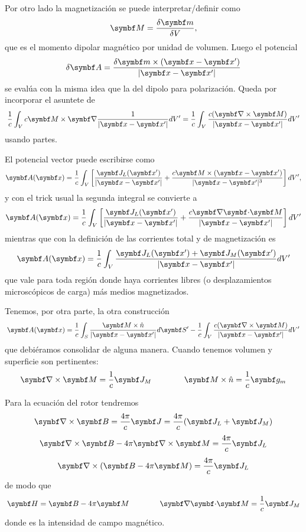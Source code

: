 \documentclass[10pt,oneside]{CBFT_book}
\begin{document}
Por otro lado la magnetización se puede interpretar/definir como
\[
	\vb{M} = \frac{\delta \vb{m}}{\delta V},
\]
que es el momento dipolar magnético por unidad de volumen. Luego el potencial 
\[
	\delta\vb{A} = \frac{ \delta \vb{m} \times ( \vbx - \vbx') }{|\vbx - \vbx'|}
\]
se evalúa con la misma idea que la del dipolo para polarización.
Queda por incorporar el asuntete de 
\[
	\frac{1}{c} \int_V c \vb{M} \times \Nabla\frac{ 1 }{|\vb{x}-\vb{x}'|}  dV'
	= \frac{1}{c} \int_V \frac{ c(\rotorm{M}) }{|\vb{x}-\vb{x}'|}  dV'
\]
usando partes.


El potencial vector puede escribirse como
\[
	\vb{A}( \vb{x}) = \frac{1}{c} \int_V 
	\left[ \frac{ \vb{J}_L(\vb{x}') }{|\vb{x}-\vb{x}'|} +
	\frac{ c \vb{M} \times (\vb{x}-\vb{x}') }{|\vb{x}-\vb{x}'|^3} \right] dV',
\]
y con el trick usual la segunda integral se convierte a 
\[
	\vb{A}( \vb{x}) = \frac{1}{c} \int_V 
	\left[ \frac{ \vb{J}_L(\vb{x}') }{|\vb{x}-\vb{x}'|} +
	\frac{ c \divem{M} }{|\vb{x}-\vb{x}'|} \right] dV'
\]
mientras que con la definición de las corrientes total y de magnetización es
\[
	\vb{A}( \vb{x}) = \frac{1}{c} \int_V 
	\frac{ \vb{J}_L(\vb{x}') + \vb{J}_M(\vb{x}' ) }{|\vb{x}-\vb{x}'|} dV'
\]
que vale para toda región donde haya corrientes libres (o desplazamientos
microscópicos de carga) más medios magnetizados.

Tenemos, por otra parte, la otra construcción
\[
	\vb{A}( \vb{x}) = \frac{1}{c} \int_S 
	\frac{ \vb{M}\times\hat{n} }{|\vb{x}-\vb{x}'|} d\vb{S}' - 
	\frac{1}{c} \int_V \frac{ c(\rotorm{M}) }{|\vb{x}-\vb{x}'|}  dV'
\]
que debiéramos consolidar de alguna manera.
Cuando tenemos volumen y superficie son pertinentes:
\[
	\rotorm{M} = \frac{1}{c}\vb{J}_M \qquad \qquad \vb{M}\times\hat{n} = \frac{1}{c}\vb{g}_m
\]

Para la ecuación del rotor tendremos
\[
	\rotorm{B} = \frac{4\pi}{c}\vb{J}  = \frac{4\pi}{c}( \vb{J}_L + \vb{J}_M )
\]
\[
	\rotorm{B} - 4\pi \rotorm{M} = \frac{4\pi}{c}\vb{J}_L
\]
\[
	\Nabla\times( \vb{B} - 4\pi\vb{M} ) = \frac{4\pi}{c}\vb{J}_L 
\]
de modo que
\[
	\vb{H} = \vb{B} - 4 \pi \vb{M} \qquad \qquad \divem{M} = \frac{1}{c}\vb{J}_M  
\]
donde  es la intensidad de campo magnético.
\end{document}

